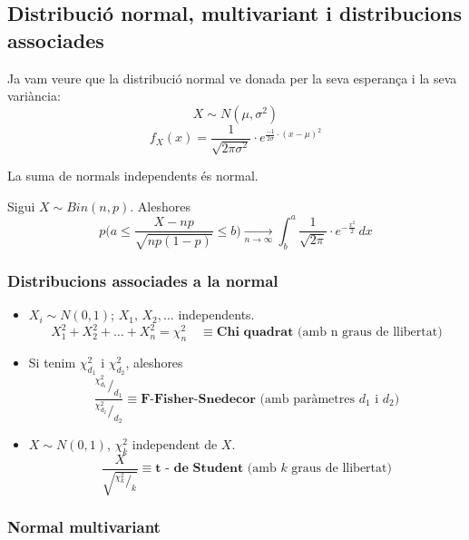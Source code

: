 \subsection{Distribució normal, multivariant i distribucions associades}

Ja vam veure que la distribució normal ve donada per la seva esperança i la seva variància: 
\[
  X \sim N(\mu, \sigma^{2})
\]
\[
  f_{X}(x) = \frac{1}{\sqrt{2\pi\sigma^{2}}}\cdot e^{\frac{-1}{2\sigma}\cdot(x-\mu)^{2}}
\]

La suma de normals independents és normal.

\begin{thm}
  Sigui $X\sim Bin(n,p)$. Aleshores 
  \[
    p\Bigg(a \leq \frac{X-np}{\sqrt{np(1-p)}}\leq b\Bigg)\xrightarrow[n\to\infty]{} \int_{b}^{a} 
    \frac{1}{\sqrt{2\pi}}\cdot e^{-\frac{x^{2}}{2}}\, dx
  \]
\end{thm}

\newpage

\subsubsection{Distribucions associades a la normal}
\begin{itemize}
    \item $X_{i}\sim N(0,1)$; $X_{1}, \, X_{2},\ldots$ independents. 
    \[
      X_{1}^{2}+X_{2}^{2}+\ldots+X_{n}^{2}=\chi_{n}^{2} \quad \equiv \textbf{Chi quadrat} 
      \text{ (amb n graus de llibertat})
    \]
    \item Si tenim $\chi_{d_{1}}^{2}$ i $\chi_{d_{2}}^{2}$, aleshores
    \[
      \frac{^{\chi_{d_{1}}^{2}} / _{d_{1}}}{^{\chi_{d_{2}}^{2}} / _{d_{2}}} \equiv \textbf{F-Fisher-Snedecor} 
      \text{ (amb paràmetres $d_{1}$ i $d_{2}$)}
    \]
    \item $X\sim N(0,1)$, $\chi_{k}^{2}$ independent de $X$.
    \[
      \frac{X}{\sqrt{^{\chi_{k}^{2}} / _k}} \equiv \textbf{t - de Student} \text{ (amb $k$ graus de llibertat)}
    \]
\end{itemize}

\subsubsection{Normal multivariant}


